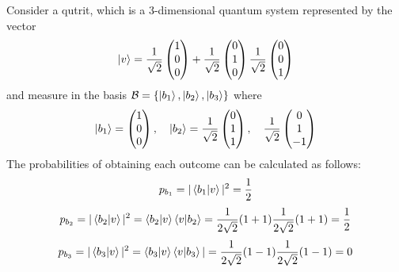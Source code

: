 \begin{example}
    Consider a qutrit, which is a 3-dimensional quantum system represented by the vector
    \[
    \ket{v}=\frac{1}{\sqrt{2}}\begin{pmatrix} 1 \\ 0 \\ 0\end{pmatrix} + \frac{1}{\sqrt{2}}\begin{pmatrix} 0 \\ 1 \\ 0\end{pmatrix}\frac{1}{\sqrt{2}}\begin{pmatrix} 0 \\ 0 \\ 1\end{pmatrix}
    \]
    and measure in the basis $\mathcal{B}=\{\ket{b_1},\ket{b_2},\ket{b_3}\}$ where
    \[
    \ket{b_1}=\begin{pmatrix} 1 \\ 0 \\ 0 \end{pmatrix}, \quad \ket{b_2} = \frac{1}{\sqrt{2}}\begin{pmatrix} 0 \\ 1 \\ 1 \end{pmatrix}, \quad \frac{1}{\sqrt{2}}\begin{pmatrix} 0 \\ 1 \\ -1 \end{pmatrix} 
    \]
    The probabilities of obtaining each outcome can be calculated as follows:
    \[
    p_{b_1}=|\braket{b_1|v}|^2=\frac{1}{2}
    \]
    \[
    p_{b_2}=|\braket{b_2|v}|^2=\braket{b_2|v}\braket{v|b_2}=\frac{1}{2\sqrt{2}}(1+1)\frac{1}{2\sqrt{2}}(1+1)=\frac{1}{2}
    \]
    \[
    p_{b_3}=|\braket{b_3|v}|^2=\braket{b_3|v}\braket{v|b_3}|=\frac{1}{2\sqrt{2}}(1-1)\frac{1}{2\sqrt{2}}(1-1)=0
    \]
\end{example}

